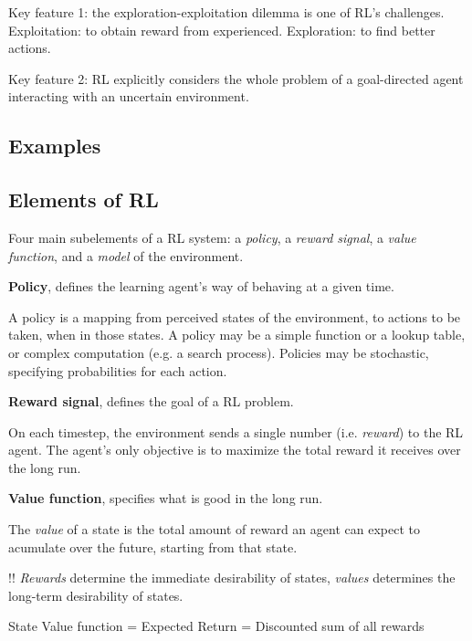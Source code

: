 \documentclass[lang=en,mode=geye,device=normal,color=blue,14pt]{elegantnote}
\DeclareMathOperator*{\1}{\mathbbm{1}}
\begin{document}
Key feature 1: the exploration-exploitation dilemma is one of RL's challenges.
Exploitation: to obtain reward from experienced.
Exploration: to find better actions.

Key feature 2: RL explicitly considers the whole problem of a goal-directed agent interacting with an uncertain environment.

\subsection{Examples}
\subsection{Elements of RL}

Four main subelements of a RL system: a \textit{policy}, a \textit{reward signal}, a \textit{value function}, and a \textit{model} of the environment.

\begin{definition}
\textbf{Policy}, defines the learning agent's way of behaving at a given time.
\end{definition}

A policy is a mapping from perceived states of the environment, to actions to be taken, when in those states.
A policy may be a simple function or a lookup table, or complex computation (e.g. a search process).
Policies may be stochastic, specifying probabilities for each action.

\begin{definition}
\textbf{Reward signal}, defines the goal of a RL problem.
\end{definition}

On each timestep, the environment sends a single number (i.e. \textit{reward}) to the RL agent. The agent's only objective is to maximize the total reward it receives over the long run.

\begin{definition}
\textbf{Value function}, specifies what is good in the long run.
\end{definition}

The \textit{value} of a state is the total amount of reward an agent can expect to acumulate over the future, starting from that state.

!! \textit{Rewards} determine the immediate desirability of states, \textit{values} determines the long-term desirability of states.

State Value function = Expected Return = Discounted sum of all rewards
\end{document}
